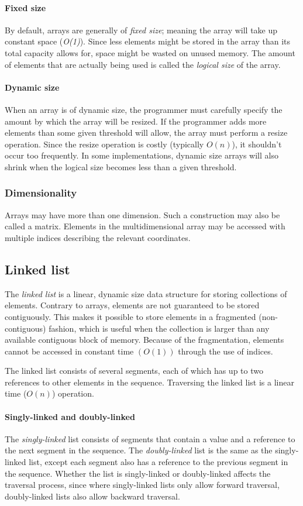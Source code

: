 \documentclass{article}
\begin{document}
\paragraph{Fixed size}
By default, arrays are generally of {\em fixed size}; meaning the array will take up constant space ({\em O(1)}).
Since less elements might be stored in the array than its total capacity allows for, space might be wasted on unused memory.
The amount of elements that are actually being used is called the {\em logical size} of the array.

\paragraph{Dynamic size}
When an array is of dynamic size, the programmer must carefully specify the amount by which the array will be resized.
If the programmer adds more elements than some given threshold will allow, the array must perform a resize operation.
Since the resize operation is costly (typically \(O(n)\)), it shouldn't occur too frequently.
In some implementations, dynamic size arrays will also shrink when the logical size becomes less than a given threshold.

\subsubsection{Dimensionality}
Arrays may have more than one dimension. Such a construction may also be called a matrix.
Elements in the multidimensional array may be accessed with multiple indices describing the relevant coordinates.


\subsection{Linked list}
The {\em linked list} is a linear, dynamic size data structure for storing collections of elements.
Contrary to arrays, elements are not guaranteed to be stored contiguously.
This makes it possible to store elements in a fragmented (non-contiguous) fashion,
which is useful when the collection is larger than any available contiguous block of memory.
Because of the fragmentation, elements cannot be accessed in constant time \((O(1))\) through the use of indices.

The linked list consists of several segments,
each of which has up to two references to other elements in the sequence.
Traversing the linked list is a linear time (\(O(n)\)) operation.

\paragraph{Singly-linked and doubly-linked}
The {\em singly-linked} list consists of segments that contain a value and a reference to the next segment in the sequence.
The {\em doubly-linked} list is the same as the singly-linked list, except each segment also has a reference to the previous segment in the sequence.
Whether the list is singly-linked or doubly-linked affects the traversal process,
since where singly-linked lists only allow forward traversal, doubly-linked lists also allow backward traversal.
\end{document}
